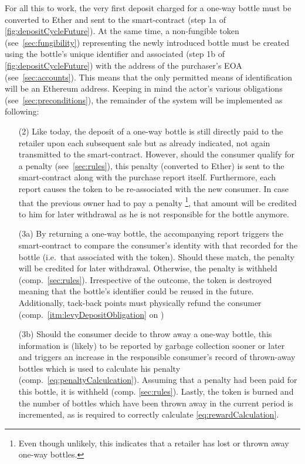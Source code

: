For all this to work, the very first deposit charged for a one-way bottle must be converted to Ether and sent to the smart-contract (step 1a of \autoref{fig:depositCycleFuture})\label{itm:basicRequirement}. At the same time, a non-fungible token (see~\ref{sec:fungibility}) representing the newly introduced bottle must be created using the bottle's unique identifier and associated (step 1b of \autoref{fig:depositCycleFuture}) with the address of the purchaser's \ac{EOA} (see~\ref{sec:accounts}). This means that the only permitted means of identification will be an Ethereum address. Keeping in mind the actor's various obligations (see~\ref{sec:preconditions}), the remainder of the system will be implemented as following: 

\begin{itemize}
	\item [(2)] Like today, the deposit of a one-way bottle is still directly paid to the retailer upon each subsequent sale but as already indicated, not again transmitted to the smart-contract. However, should the consumer qualify for a penalty (see~\ref{sec:rules}), this penalty (converted to Ether) is sent to the smart-contract along with the purchase report itself. Furthermore, each report causes the token to be re-associated with the new consumer. In case that the previous owner had to pay a penalty \footnote{Even though unlikely, this indicates that a retailer has lost or thrown away one-way bottles.}, that amount will be credited to him for later withdrawal as he is not responsible for the bottle anymore.
	\item [(3a)] By returning a one-way bottle, the accompanying report triggers the smart-contract to compare the consumer's identity with that recorded for the bottle (i.e.~that associated with the token). Should these match, the penalty will be credited for later withdrawal. Otherwise, the penalty is withheld (comp.~\ref{sec:rules}). Irrespective of the outcome, the token is destroyed meaning that the bottle's identifier could be reused in the future. Additionally, tack-back points must physically refund the consumer (comp.~\ref{itm:levyDepositObligation} on )
	\item [(3b)] Should the consumer decide to throw away a one-way bottle, this information is (likely) to be reported by garbage collection sooner or later and triggers an increase in the responsible consumer's record of thrown-away bottles which is used to calculate his penalty (comp.~\autoref{eq:penaltyCalculcation}). Assuming that a penalty had been paid for this bottle, it is withheld (comp. \ref{sec:rules}). Lastly, the token is burned and the number of bottles which have been thrown away in the current period is incremented, as is required to correctly calculate \autoref{eq:rewardCalculation}.

\end{itemize}
